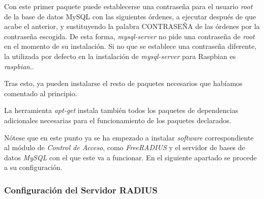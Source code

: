 Con este primer paquete puede establecerse una contraseña para el usuario \emph{root} de la base de datos MySQL con las siguientes órdenes, a ejecutar después de que acabe el anterior, y sustituyendo la palabra CONTRASEÑA de las órdenes por la contraseña escogida. De esta forma, \emph{mysql-server} no pide una contraseña de \emph{root} en el momento de su instalación. Si no que se establece una contraseña diferente, la utilizada por defecto en la instalación de \emph{mysql-server} para Raspbian es \emph{raspbian}..


Tras esto, ya pueden instalarse el resto de paquetes necesarios que habíamos comentado al principio.

La herramienta \emph{apt-get} instala también todos los paquetes de dependencias adicionales necesarias para el funcionamiento de los paquetes declarados.

Nótese que en este punto ya se ha empezado a instalar \emph{software} correspondiente al módulo de \emph{Control de Acceso}, como \emph{FreeRADIUS} y el servidor de bases de datos \emph{MySQL} con el que este va a funcionar. En el siguiente apartado se procede a su configuración.

\subsubsection{Configuración del Servidor RADIUS} \label{RADIUSConf}

